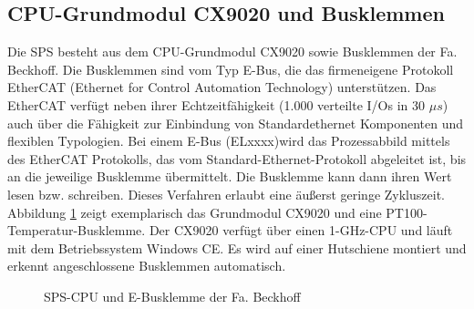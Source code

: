  
\subsection*{CPU-Grundmodul CX9020 und Busklemmen} 
 
Die SPS besteht aus dem CPU-Grundmodul CX9020 sowie Busklemmen der Fa. Beckhoff. Die Busklemmen sind vom Typ E-Bus, die das firmeneigene Protokoll EtherCAT (Ethernet for Control Automation Technology) unterstützen.  Das EtherCAT verfügt neben ihrer Echtzeitfähigkeit (1.000 verteilte I/Os in 30 $\mu s$\citep{Beckhoff2016}) auch über die Fähigkeit zur Einbindung von  Standardethernet Komponenten und flexiblen Typologien. Bei einem E-Bus (ELxxxx)wird das Prozessabbild mittels des EtherCAT
Protokolls, das vom Standard-Ethernet-Protokoll abgeleitet ist, bis an die jeweilige Busklemme übermittelt. Die Busklemme kann dann ihren Wert lesen bzw. schreiben. Dieses Verfahren erlaubt eine äußerst geringe Zykluszeit. Abbildung \ref{fig:Beckhoffklemmen} zeigt exemplarisch das Grundmodul CX9020 und eine PT100-Temperatur-Busklemme. Der CX9020 verfügt über einen 1-GHz-CPU und läuft mit dem Betriebssystem Windows CE. Es wird auf einer Hutschiene montiert und erkennt angeschlossene Busklemmen automatisch. 

\begin{figure}[htb]
\centering
{}
\caption{SPS-CPU und E-Busklemme der Fa. Beckhoff}
\label{fig:Beckhoffklemmen}
\end{figure}

